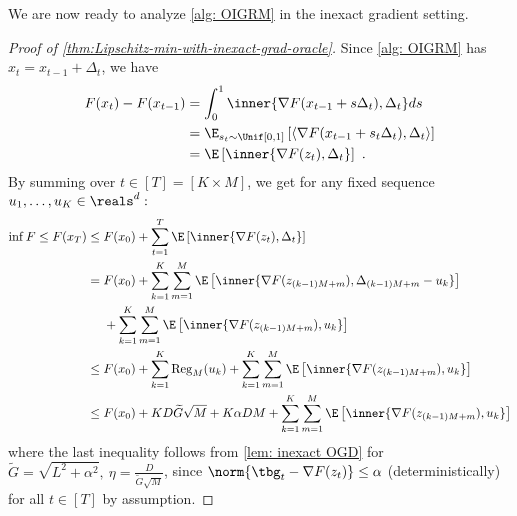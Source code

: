 We are now ready to analyze \cref{alg: OIGRM} in the inexact gradient setting.
\begin{proof}[Proof of \cref{thm:Lipschitz-min-with-inexact-grad-oracle}]
Since \cref{alg: OIGRM}  has $x_t=x_{t-1}+\Delta_{t}$, we have
\begin{align*}
F(x_t)-F(x_{t-1})
&=\int_{0}^{1}\inner{\nabla F(x_{t-1}+s\Delta_t),\Delta_t}ds
\\
&=\E_{s_t\sim\Unif[0,1]}\left[\langle\nabla F(x_{t-1}+s_t{\Delta}_t),\Delta_t\rangle\right]
\\&=\E\left[\inner{\nabla F(z_{t}),\Delta_t}\right]~.
\end{align*}
By summing over $t\in[T]=[K\times M]$, we get for any fixed sequence $u_1,\dots,u_K\in\reals^d:$
\begin{align*}
    \inf F\leq F(x_T)
    &\leq F(x_0)+\sum_{t=1}^{T}\E\left[\inner{\nabla F(z_{t}),\Delta_t}\right]
    \\&=F(x_0)+\sum_{k=1}^{K}\sum_{m=1}^{M}\E\left[\inner{\nabla F(z_{(k-1)M+m}),\Delta_{(k-1)M+m}-u_k}\right]\\
    &~~~~+\sum_{k=1}^{K}\sum_{m=1}^{M}\E\left[\inner{\nabla F(z_{(k-1)M+m}),u_k}\right]
    \\
    &\leq  F(x_0)+\sum_{k=1}^{K}\mathrm{Reg}_M(u_k)+\sum_{k=1}^{K}\sum_{m=1}^{M}\E\left[\inner{\nabla F(z_{(k-1)M+m}),u_k}\right]
    \\
    &\leq F(x_0)+KD\widetilde{G}\sqrt{M}+K\alpha DM+\sum_{k=1}^{K}\sum_{m=1}^{M}\E\left[\inner{\nabla F(z_{(k-1)M+m}),u_k}\right]
\end{align*}
where the last inequality follows from \cref{lem: inexact OGD}
for $\widetilde{G}=\sqrt{L^2+\alpha^2},~\eta=\frac{D}{\widetilde{G}\sqrt{M}}$, since 
$\norm{\tbg_t-\nabla F(z_t)}\leq\alpha$ (deterministically) for all $t\in[T]$ by assumption.

\end{proof}
